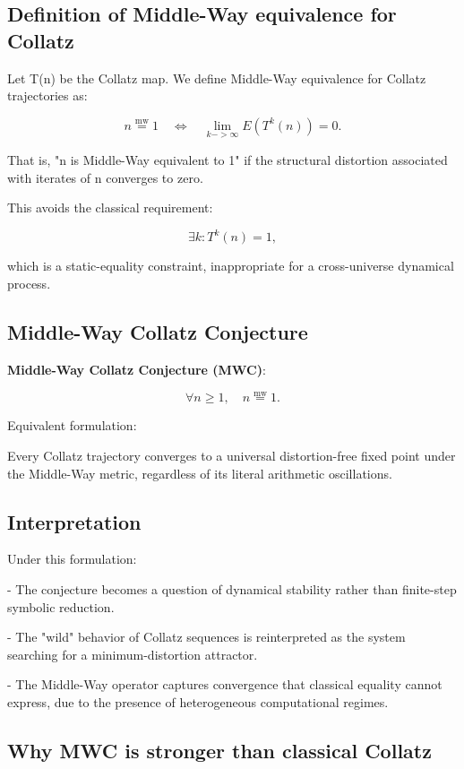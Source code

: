 \documentclass[11pt]{article}
\newcommand{\mweq}{\mathrel{\overset{\mathrm{mw}}{=}}}
\theoremstyle{definition}
\theoremstyle{remark}
\begin{document}
\subsection{Definition of Middle-Way equivalence for Collatz}

Let T(n) be the Collatz map.  
We define Middle-Way equivalence for Collatz trajectories as:

\[
  n \mweq 1
  \quad \Longleftrightarrow \quad
  \lim_{k->\infty} E(T^k(n)) = 0.
\]

That is, "n is Middle-Way equivalent to 1" if the structural distortion
associated with iterates of n converges to zero.

This avoids the classical requirement:

\[
  \exists k : T^k(n) = 1,
\]

which is a static-equality constraint, inappropriate for a
cross-universe dynamical process.

\subsection{Middle-Way Collatz Conjecture}

\textbf{Middle-Way Collatz Conjecture (MWC)}:

\[
  \forall n \ge 1, \quad n \mweq 1.
\]

Equivalent formulation:

Every Collatz trajectory converges to a universal distortion-free fixed
point under the Middle-Way metric, regardless of its literal arithmetic
oscillations.

\subsection{Interpretation}

Under this formulation:

- The conjecture becomes a question of dynamical stability rather than
  finite-step symbolic reduction.

- The "wild" behavior of Collatz sequences is reinterpreted as the
  system searching for a minimum-distortion attractor.

- The Middle-Way operator captures convergence that classical equality
  cannot express, due to the presence of heterogeneous computational
  regimes.

\subsection{Why MWC is stronger than classical Collatz}
\end{document}
